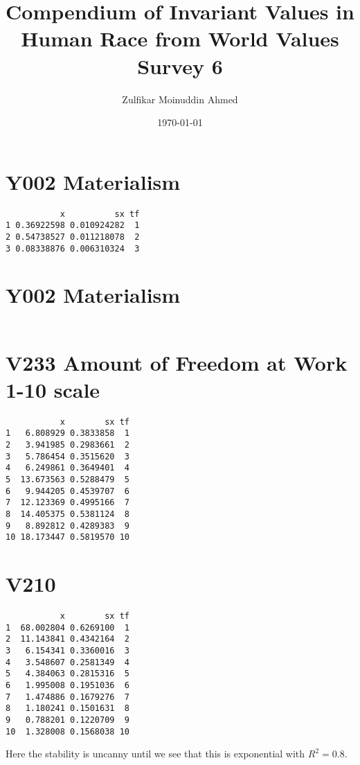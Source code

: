 \documentclass{amsart}
\title{Compendium of Invariant Values in Human Race from World Values Survey 6}
\author{Zulfikar Moinuddin Ahmed}
\date{\today}
\begin{document}
\maketitle

\section{Y002 Materialism}

\begin{verbatim}
           x          sx tf
1 0.36922598 0.010924282  1
2 0.54738527 0.011218078  2
3 0.08338876 0.006310324  3
\end{verbatim}

\section{Y002 Materialism}

\begin{verbatim}
\end{verbatim}

\section{V233 Amount of Freedom at Work 1-10 scale}

\begin{verbatim}
           x        sx tf
1   6.808929 0.3833858  1
2   3.941985 0.2983661  2
3   5.786454 0.3515620  3
4   6.249861 0.3649401  4
5  13.673563 0.5288479  5
6   9.944205 0.4539707  6
7  12.123369 0.4995166  7
8  14.405375 0.5381124  8
9   8.892812 0.4289383  9
10 18.173447 0.5819570 10
\end{verbatim}

\section{V210 }

\begin{verbatim}
           x        sx tf
1  68.002804 0.6269100  1
2  11.143841 0.4342164  2
3   6.154341 0.3360016  3
4   3.548607 0.2581349  4
5   4.384063 0.2815316  5
6   1.995008 0.1951036  6
7   1.474886 0.1679276  7
8   1.180241 0.1501631  8
9   0.788201 0.1220709  9
10  1.328008 0.1568038 10
\end{verbatim}

Here the stability is uncanny until we see that this is exponential with $R^2=0.8$.
\end{document}
